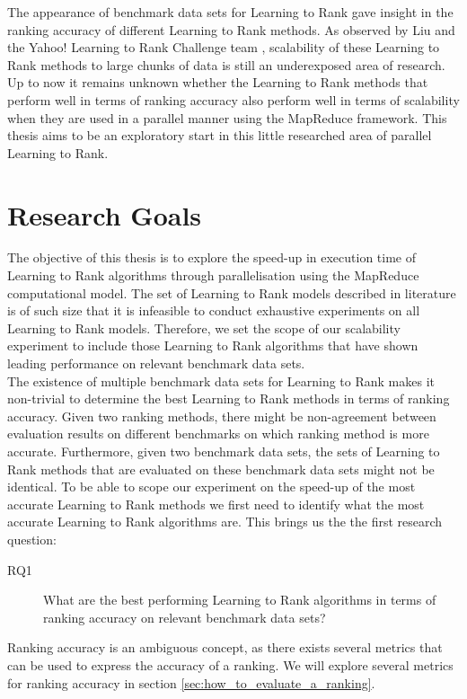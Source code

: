 The appearance of benchmark data sets for Learning to Rank gave insight in the ranking accuracy of different Learning to Rank methods. As observed by Liu \cite{Liu2007} and the Yahoo! Learning to Rank Challenge team \cite{Chapelle2011b}, scalability of these Learning to Rank methods to large chunks of data is still an underexposed area of research. Up to now it remains unknown whether the Learning to Rank methods that perform well in terms of ranking accuracy also perform well in terms of scalability when they are used in a parallel manner using the MapReduce framework. This thesis aims to be an exploratory start in this little researched area of parallel Learning to Rank.\\

\section{Research Goals}
\label{sec:goals}
The objective of this thesis is to explore the speed-up in execution time of Learning to Rank algorithms through parallelisation using the MapReduce computational model. The set of Learning to Rank models described in literature is of such size that it is infeasible to conduct exhaustive experiments on all Learning to Rank models. Therefore, we set the scope of our scalability experiment to include those Learning to Rank algorithms that have shown leading performance on relevant benchmark data sets.\\

The existence of multiple benchmark data sets for Learning to Rank makes it non-trivial to determine the best Learning to Rank methods in terms of ranking accuracy. Given two ranking methods, there might be non-agreement between evaluation results on different benchmarks on which ranking method is more accurate. Furthermore, given two benchmark data sets, the sets of Learning to Rank methods that are evaluated on these benchmark data sets might not be identical. To be able to scope our experiment on the speed-up of the most accurate Learning to Rank methods we first need to identify what the most accurate Learning to Rank algorithms are. This brings us the the first research question: \\

\begin{description}
\item[RQ1] What are the best performing Learning to Rank algorithms in terms of ranking accuracy on relevant benchmark data sets?
\end{description}
\bigskip
Ranking accuracy is an ambiguous concept, as there exists several metrics that can be used to express the accuracy of a ranking. We will explore several metrics for ranking accuracy in section \ref{sec:how_to_evaluate_a_ranking}.\\

